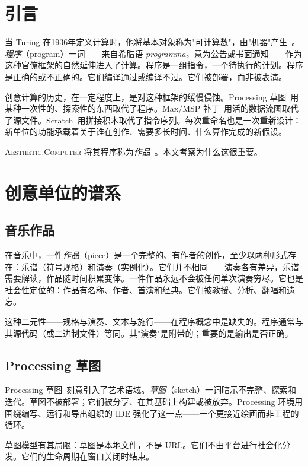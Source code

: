 \documentclass[10pt,letterpaper,twocolumn]{article}
\newcommand{\ac}{\textsc{Aesthetic.Computer}}
\begin{document}
\section{引言}

当 Turing 在1936年定义计算时，他将基本对象称为"可计算数"，由"机器"产生~\citep{turing1936computable}。\emph{程序}（program）一词——来自希腊语 \emph{programma}，意为公告或书面通知——作为这种官僚框架的自然延伸进入了计算。程序是一组指令，一个待执行的计划。程序是正确的或不正确的。它们编译通过或编译不过。它们被部署，而非被表演。

创意计算的历史，在一定程度上，是对这种框架的缓慢侵蚀。Processing 草图~\citep{reas2007processing}用某种一次性的、探索性的东西取代了程序。Max/MSP 补丁~\citep{puckette1988patcher}用活的数据流图取代了源文件。Scratch~\citep{resnick2009scratch}用拼接积木取代了指令序列。每次重命名也是一次重新设计：新单位的功能承载着关于谁在创作、需要多长时间、什么算作完成的新假设。

\ac{} 将其程序称为\emph{作品}~\citep{scudder2026ac}。本文考察为什么这很重要。

\section{创意单位的谱系}

\subsection{音乐作品}

在音乐中，一件\emph{作品}（piece）是一个完整的、有作者的创作，至少以两种形式存在：乐谱（符号规格）和演奏（实例化）。它们并不相同——演奏各有差异，乐谱需要解读，作品随时间积累变体。一件作品永远不会被任何单次演奏穷尽。它也是社会性定位的：作品有名称、作者、首演和经典。它们被教授、分析、翻唱和遗忘。

这种二元性——规格与演奏、文本与施行——在程序概念中是缺失的。程序通常与其源代码（或二进制文件）等同。其"演奏"是附带的；重要的是输出是否正确。

\subsection{Processing 草图}

Processing 草图~\citep{reas2007processing}刻意引入了艺术语域。\emph{草图}（sketch）一词暗示不完整、探索和迭代。草图不被部署；它们被分享、在其基础上构建或被放弃。Processing 环境用围绕编写、运行和导出组织的 IDE 强化了这一点——一个更接近绘画而非工程的循环。

草图模型有其局限：草图是本地文件，不是 URL。它们不由平台进行社会化分发。它们的生命周期在窗口关闭时结束。
\end{document}

